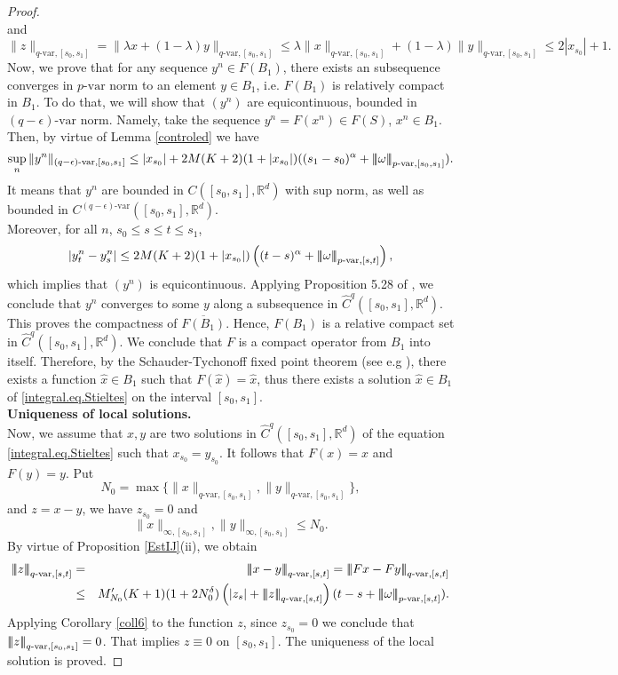 \documentclass[10pt]{article}
\numberwithin{equation}{section} %
\newcommand{\R}{\ensuremath{\mathbb{R}}}
\newcommand{\ltn}{\ensuremath{\left| \! \left| \! \left|}}
\newcommand{\rtn}{\ensuremath{\right| \! \right| \! \right|}}
\begin{document}
\begin{proof}
$$$$	
and 
$$
\|z\|_{q\text{-var},[s_0,s_1]} = \|\lambda x+(1-\lambda)y\|_{q\text{-var},[s_0,s_1]}\leq \lambda\|x\|_{q\text{-var},[s_0,s_1]}+(1-\lambda)\|y\|_{q\text{-var},[s_0,s_1]} \leq 2|x_{s_0}|+1.
$$
Now,  we prove that for any sequence $y^n\in F(B_1)$, there exists an subsequence converges in $p\text{-var}$ norm to an element $y\in B_1$, i.e. $F(B_1)$ is relatively compact in $B_1$. To do that, we will show that $(y^n)$ are   equicontinuous, bounded in $(q-\epsilon)\text{-var}$ norm. Namely, take the sequence $y^n=F(x^n)\in F(S)$, $x^n\in B_1$. Then, by virtue of Lemma \ref{controled} we have%
$$
\sup_n \|y^n\|_{(q-\epsilon)\text{-var},[s_0,s_1]}\leq |x_{s_0}|+ 2M(K+2)(1+|x_{s_0}|)((s_1-s_0)^{\alpha}+\ltn\omega\rtn_{p\text{-var},[s_0,s_1]}).
$$
It means that $y^n$ are bounded in $C([s_0,s_1],\R^d)$ with sup norm, as well as bounded in $C^{(q-\epsilon)\text{-var}}([s_0,s_1],\R^d)$.\\
Moreover, for all $n$, $s_0\leq s\leq t\leq s_1$,
 $$
 |y^n_t-y^n_s|\leq 2M(K+2)(1+|x_{s_0}|)\left((t-s)^{\alpha}+\ltn\omega\rtn_{p\text{-var},[s,t]}\right),
 $$
which implies that $(y^n)$ is equicontinuous. Applying Proposition 5.28 of \cite{friz}, we conclude that $y^n$ converges to some $y$ along a subsequence in $\widehat{C}^{q}([s_0,s_1],\R^d)$. This proves the compactness of $\overline{F(B_1)}$. Hence, $F(B_1)$ is a relative compact set in $\widehat{C}^{q}([s_0,s_1],\R^d)$. 
We conclude that $F$ is a compact operator from $B_1$ into itself. 
Therefore, by the Schauder-Tychonoff fixed point  theorem (see e.g \cite[Theorem 2.A, p. 56]{Zeidler}), there exists a function $\hat{x}\in B_1$ such that $F(\hat{x})=\hat{x}$, thus there exists a solution  $\hat{x}\in B_1$ of \eqref{integral.eq.Stieltes} on the interval $[s_0,s_1]$.
\medskip\\
	{\bf {Uniqueness of local solutions}.}
	\medskip\\
		Now, we assume that $x,y$ are two solutions in $\widehat{C}^{q}([s_0,s_1],\R^d)$ of the equation \eqref{integral.eq.Stieltes}  such that $x_{s_0}=y_{s_0}$. It follows that
	$F(x)=x$ and $F(y)=y$. Put
	$$
	N_0 = \max\{\|x\|_{q\text{-var},[s_0,s_1]},\|y\|_{q\text{-var},[s_0,s_1]}\},
	$$ 
	and $z=x-y$, we have $z_{s_0} = 0$ and
	$$\|x\|_{\infty,[s_0,s_1]},\|y\|_{\infty,[s_0,s_1]}\leq N_0.$$
		By virtue of Proposition \ref{EstIJ}(ii), we obtain
	\begin{eqnarray}
	\ltn z\rtn_{q\text{-var},[s,t]}&=&\ltn x-y\rtn_{q\text{-var},[s,t]}= \ltn Fx-Fy\rtn_{q\text{-var},[s,t]}\\
	&\leq& M'_{N_0}(K+1) (1+ 2N_0^\delta) \left(|z_s|+ \ltn z\rtn_{q\text{-var},[s,t]}\right)(t-s+\ltn\omega\rtn_{p\text{-var},[s,t]}).\notag
	\end{eqnarray}
Applying Corollary \ref{coll6} to the function $z$, since $z_{s_0} = 0$ we conclude that $\ltn z\rtn_{q\text{-var},[s_0,s_1]} =0$. That  implies $z\equiv 0$ on $[s_0,s_1]$. The uniqueness of the local solution is proved.


\end{proof}
\end{document}
